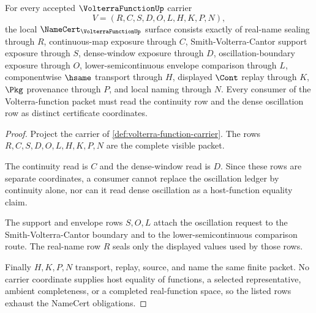 \begin{theorem}
\label{thm:volterra-function-namecert-obligations}
For every accepted $\VolterraFunctionUp$ carrier
$$
V=(R,C,S,D,O,L,H,K,P,N),
$$
the local $\NameCert_{\VolterraFunctionUp}$ surface consists exactly of real-name sealing through $R$, continuous-map exposure through $C$, Smith-Volterra-Cantor support exposure through $S$, dense-window exposure through $D$, oscillation-boundary exposure through $O$, lower-semicontinuous envelope comparison through $L$, componentwise $\hsame$ transport through $H$, displayed $\Cont$ replay through $K$, $\Pkg$ provenance through $P$, and local naming through $N$. Every consumer of the Volterra-function packet must read the continuity row and the dense oscillation row as distinct certificate coordinates.
\end{theorem}
\begin{proof}
Project the carrier of \autoref{def:volterra-function-carrier}. The rows $R,C,S,D,O,L,H,K,P,N$ are the complete visible packet.

The continuity read is $C$ and the dense-window read is $D$. Since these rows are separate coordinates, a consumer cannot replace the oscillation ledger by continuity alone, nor can it read dense oscillation as a host-function equality claim.

The support and envelope rows $S,O,L$ attach the oscillation request to the Smith-Volterra-Cantor boundary and to the lower-semicontinuous comparison route. The real-name row $R$ seals only the displayed values used by those rows.

Finally $H,K,P,N$ transport, replay, source, and name the same finite packet. No carrier coordinate supplies host equality of functions, a selected representative, ambient completeness, or a completed real-function space, so the listed rows exhaust the NameCert obligations.
\end{proof}

